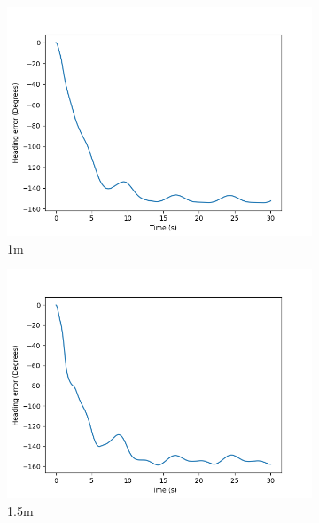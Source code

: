 \documentclass[class=article, crop=false]{standalone}
\begin{document}
\begin{figure}
\begin{subfigure}[b]{0.48\textwidth}
        \includegraphics{scenario1/rov-100m/1.0m/usv_heading_error_uncontrolled}
        \caption{1m}
        \label{}
    \end{subfigure}
    \hfill
    \begin{subfigure}[b]{0.48\textwidth}
        \centering
        \includegraphics{scenario1/rov-100m/1.5m/usv_heading_error_uncontrolled}
        \caption{1.5m}
        \label{}
    \end{subfigure}
    \vfill
    \begin{subfigure}[b]{0.48\textwidth}
        \centering

\end{subfigure}
\end{figure}
\end{document}
